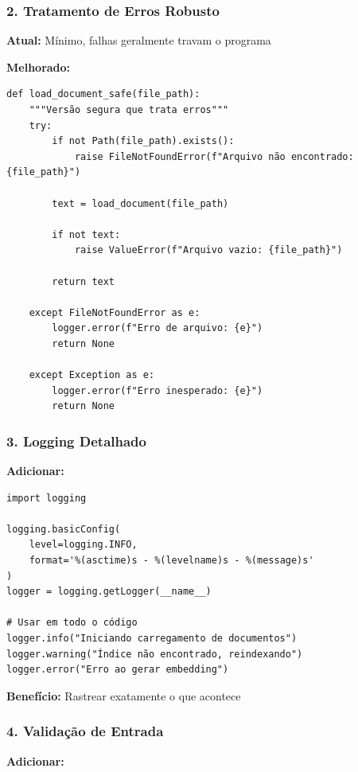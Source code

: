 \documentclass[12pt,a4paper]{article}
\begin{document}
\subsubsection{2. Tratamento de Erros Robusto}

\textbf{Atual:} Mínimo, falhas geralmente travam o programa

\textbf{Melhorado:}

\begin{lstlisting}
def load_document_safe(file_path):
    """Versão segura que trata erros"""
    try:
        if not Path(file_path).exists():
            raise FileNotFoundError(f"Arquivo não encontrado: {file_path}")
        
        text = load_document(file_path)
        
        if not text:
            raise ValueError(f"Arquivo vazio: {file_path}")
        
        return text
    
    except FileNotFoundError as e:
        logger.error(f"Erro de arquivo: {e}")
        return None
    
    except Exception as e:
        logger.error(f"Erro inesperado: {e}")
        return None
\end{lstlisting}

\subsubsection{3. Logging Detalhado}

\textbf{Adicionar:}

\begin{lstlisting}
import logging

logging.basicConfig(
    level=logging.INFO,
    format='%(asctime)s - %(levelname)s - %(message)s'
)
logger = logging.getLogger(__name__)

# Usar em todo o código
logger.info("Iniciando carregamento de documentos")
logger.warning("Índice não encontrado, reindexando")
logger.error("Erro ao gerar embedding")
\end{lstlisting}

\textbf{Benefício:} Rastrear exatamente o que acontece

\subsubsection{4. Validação de Entrada}

\textbf{Adicionar:}
\end{document}
